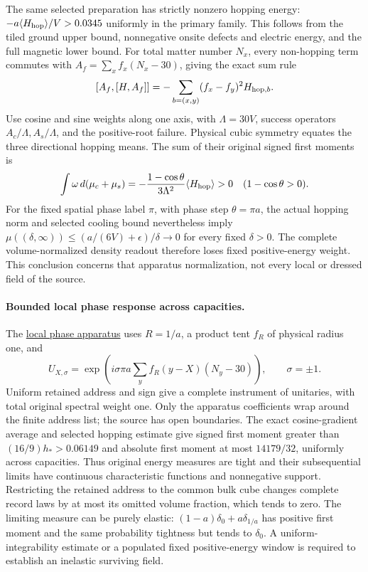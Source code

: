 The same selected preparation has strictly nonzero hopping energy:
$-a\langle H_{\rm hop}\rangle/V>0.0345$ uniformly in the primary
family. This follows from the tiled ground upper bound, nonnegative
onsite defects and electric energy, and the full magnetic lower bound.
For total matter number $N_x$, every non-hopping term commutes with
$A_f=\sum_x f_x(N_x-30)$, giving the exact sum rule
\[
 [A_f,[H,A_f]]=-\sum_{b=(x,y)}(f_x-f_y)^2 H_{{\rm hop},b}.
\]
Use cosine and sine weights along one axis, with $\Lambda=30V$,
success operators $A_c/\Lambda,A_s/\Lambda$, and the positive-root
failure. Physical cubic symmetry equates the three directional hopping
means. The sum of their original signed first moments is
\[
 \int\omega\,d(\mu_c+\mu_s)
   =-\frac{1-\cos\theta}{3\Lambda^2}\langle H_{\rm hop}\rangle>0
       \quad (1-\cos\theta>0).
\]
For the fixed spatial phase label $\pi$, with phase step $\theta=\pi a$, the actual hopping norm
and selected cooling bound nevertheless imply
$\mu((\delta,\infty))\le(a/(6V)+\epsilon)/\delta\to0$
for every fixed $\delta>0$. The complete volume-normalized density
readout therefore loses fixed positive-energy weight. This conclusion
concerns that apparatus normalization, not every local or dressed field
of the source.

\paragraph{Bounded local phase response across capacities.}
The \href{https://github.com/FloatingPragma/observer-patch-holography/blob/main/model/particle_primary_local_fluctuation/PROOF.md}{local phase apparatus}
uses $R=1/a$, a product tent $f_R$ of physical radius one, and
\[
 U_{X,\sigma}=\exp\!\left(i\sigma\pi a
                   \sum_y f_R(y-X)(N_y-30)\right),\qquad \sigma=\pm1.
\]
Uniform retained address and sign give a complete instrument of unitaries,
with total original spectral weight one. Only the apparatus coefficients
wrap around the finite address list; the source has open boundaries.
The exact cosine-gradient average and selected hopping estimate give
signed first moment greater than $(16/9)h_*>0.06149$ and absolute first
moment at most $14179/32$, uniformly across capacities. Thus original
energy measures are tight and their subsequential limits have continuous
characteristic functions and nonnegative support. Restricting the retained
address to the common bulk cube changes complete record laws by at most
its omitted volume fraction, which tends to zero. The limiting measure
can be purely elastic: $(1-a)\delta_0+a\delta_{1/a}$ has positive first
moment and the same probability tightness but tends to $\delta_0$.
A uniform-integrability estimate or a populated fixed positive-energy
window is required to establish an inelastic surviving field.

